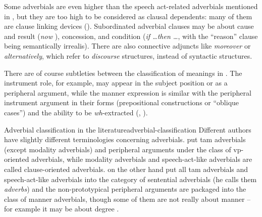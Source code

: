 \documentclass[UTF8, a4paper, oneside, scheme=plain, 12pt]{ctexbook}
\newcommand*{\citepage}[1]{p.~{#1}}
\newcommand*{\term}[1]{\emph{#1}}
\newcommand{\form}[1]{\emph{#1}}
\begin{document}
Some adverbials are even higher than the speech act-related adverbials 
mentioned in ,
but they are too high to be considered as clausal dependents:
many of them are clause linking devices ().
Subordinated adverbial clauses may be about 
cause and result (\form{now }), 
concession, 
and condition (\form{if \dots then \dots}, with the ``reason'' clause being semantically irrealis).
There are also connective adjuncts like \form{moreover} or \form{alternatively},
which refer to \emph{discourse} structures, instead of syntactic structures.

There are of course subtleties between the classification of meanings in .
The instrument role, for example, 
may appear in the subject position or as a peripheral argument, 
while the manner expression is similar with the peripheral instrument argument 
in their forms (prepositional constructions or ``oblique cases'')
and the ability to be \form{wh}-extracted
(, ).

\begin{infobox}{Adverbial classification in the literature}{adverbial-classification}
    Different authors have slightly different terminologies concerning adverbials.
    \citet[\citepage{576}]{cgel} put \acs{tam} adverbials (except modality adverbials) 
    and peripheral arguments
    under the class of \acs{vp}-oriented adverbials, 
    while modality adverbials and speech-act-like adverbials are called clause-oriented adverbials.
    \citet[\citepage{386}]{dixon2005semantic} on the other hand 
    put all \acs{tam} adverbials and speech-act-like adverbials 
    into the category of sentential adverbials (he calls them \term{adverbs})
    and the non-prototypical peripheral arguments are packaged into the class of manner adverbials,
    though some of them are not really about manner -- 
    for example it may be about degree \citet[\citepage{576}]{cgel}.
\end{infobox}
\end{document}
